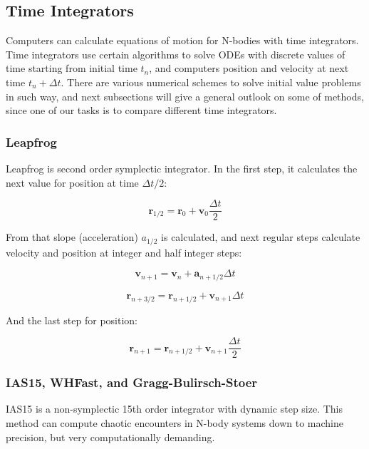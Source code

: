 \documentclass[12pt,a4paper]{article}
\begin{document}
\subsection{Time Integrators}
\label{integrators}
Computers can calculate equations of motion for N-bodies with time integrators. Time integrators use certain algorithms to solve ODEs with discrete values of time starting from initial time $t_n$, and computers position and velocity at next time $t_n+\Delta t$. There are various numerical schemes to solve initial value problems in such way, and next subsections will give a general outlook on some of methods, since one of our tasks is to compare different time integrators.

\subsubsection{Leapfrog}

Leapfrog is second order symplectic integrator. In the first step, it calculates the next value for position at time $\Delta t/2$:

\begin{equation}
	\textbf{r}_{1/2} = \textbf{r}_0 + \textbf{v}_0 \frac{\Delta t}{2}
\end{equation}

From that slope (acceleration) $a_{1/2}$ is calculated, and next regular steps calculate velocity and position at integer and half integer steps:

\begin{equation}
	\textbf{v}_{n+1} = \textbf{v}_n + \textbf{a}_{n+1/2} \Delta t
\end{equation}

\begin{equation}
	\textbf{r}_{n+3/2} = \textbf{r}_{n+1/2} + \textbf{v}_{n+1} \Delta t
\end{equation}

And the last step for position:

\begin{equation}
	\textbf{r}_{n+1} = \textbf{r}_{n+1/2} + \textbf{v}_{n+1} \frac{\Delta t}{2}
\end{equation}

\subsubsection{IAS15, WHFast, and Gragg-Bulirsch-Stoer}

IAS15 is a non-symplectic 15th order integrator with dynamic step size. This method can compute chaotic encounters in N-body systems down to machine precision, but very computationally demanding.
\end{document}
